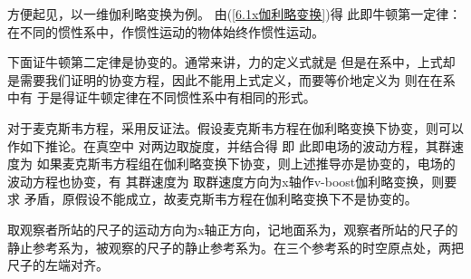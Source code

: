 
    方便起见，以一维伽利略变换为例。
    由(\ref{6.1x伽利略变换})得
    此即牛顿第一定律：在不同的惯性系中，作惯性运动的物体始终作惯性运动。
    
    下面证牛顿第二定律是协变的。通常来讲，力的定义式就是
    但是在系中，上式却是需要我们证明的协变方程，因此不能用上式定义，而要等价地定义为
    则在在系中有
    于是得证牛顿定律在不同惯性系中有相同的形式。
    
    对于麦克斯韦方程，采用反证法。假设麦克斯韦方程在伽利略变换下协变，则可以作如下推论。在真空中
    对两边取旋度，并结合得
    即
    此即电场的波动方程，其群速度为
    如果麦克斯韦方程组在伽利略变换下协变，则上述推导亦是协变的，电场的波动方程也协变，有
    其群速度为
    取群速度方向为x轴作v-boost伽利略变换，则要求
    矛盾，原假设不能成立，故麦克斯韦方程在伽利略变换下不是协变的。
    


    取观察者所站的尺子的运动方向为x轴正方向，记地面系为\nota{\Sigma}，观察者所站的尺子的静止参考系为，被观察的尺子的静止参考系为。在三个参考系的时空原点处，两把尺子的左端对齐。
    
